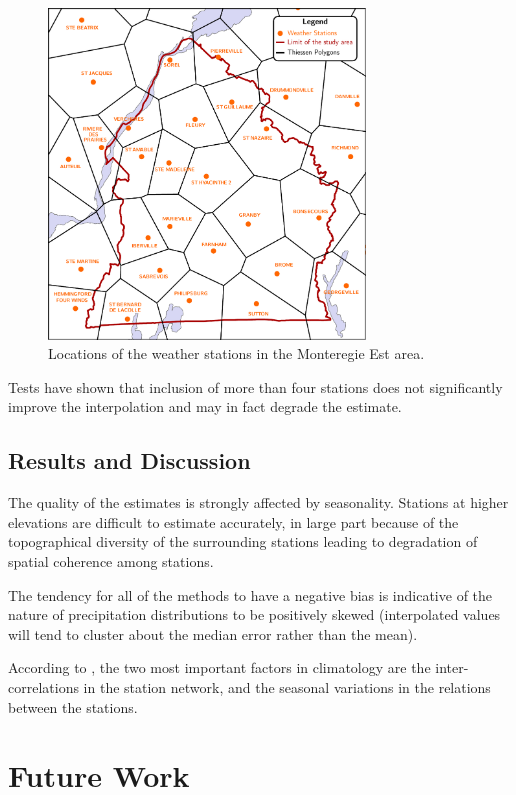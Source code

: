 \documentclass[WHATMANUAL.tex]{subfiles}
\begin{document}
\begin{figure}
\centering
\includegraphics[width=0.75\textwidth]{img/Thiessen_meteo}
\caption[Locations of the weather stations in the Monteregie Est area.]{Locations of the weather stations in the Monteregie Est area.}
\label{fig:Thiessen_meteo}
\end{figure}


Tests have shown that inclusion of more than four stations does not significantly improve the interpolation and may in fact degrade the estimate. 

\subsection{Results and Discussion}

The quality of the estimates is strongly affected by seasonality. Stations at higher elevations are difficult to estimate accurately, in large part because of the topographical diversity of the surrounding stations leading to degradation of spatial coherence among stations.

The tendency for all of the methods to have a negative bias is indicative of the nature of precipitation distributions to be positively skewed (interpolated values will tend to cluster about the median error rather than the mean).

According to \cite{xia_forest_1999}, the two most important factors in climatology are the inter-correlations in the station network, and the seasonal variations in the relations between the stations.

\section{Future Work}
\end{document}

